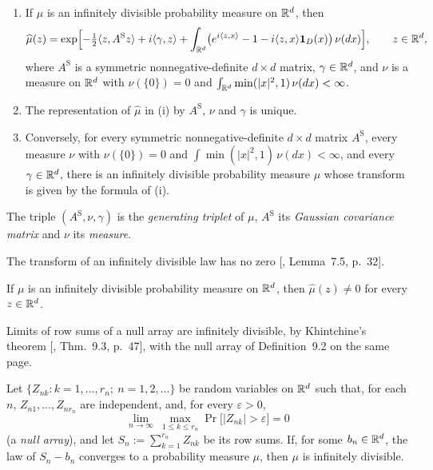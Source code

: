 \begin{theorem}
\label{thm:cited-A39}

\begin{enumerate}
\item[(i)] If $\mu$ is an infinitely divisible probability measure on $\mathbb{R}^d$, then
\[
  \widehat\mu(z) = \exp\Bigl[-\tfrac12\langle z, A^{\mathrm S}z\rangle + i\langle\gamma, z\rangle
  + \int_{\mathbb{R}^d}\bigl(e^{i\langle z, x\rangle} - 1 - i\langle z, x\rangle\mathbf{1}_D(x)\bigr)\,
  \nu(dx)\Bigr], \qquad z \in \mathbb{R}^d,
\]
where $A^{\mathrm S}$ is a symmetric nonnegative-definite $d \times d$ matrix, $\gamma \in \mathbb{R}^d$, and $\nu$
is a measure on $\mathbb{R}^d$ with $\nu(\{0\}) = 0$ and $\int_{\mathbb{R}^d}\min(|x|^2, 1)\,\nu(dx) < \infty$.
\item[(ii)] The representation of $\widehat\mu$ in (i) by $A^{\mathrm S}$, $\nu$ and $\gamma$ is unique.
\item[(iii)] Conversely, for every symmetric nonnegative-definite $d \times d$ matrix $A^{\mathrm S}$, every
measure $\nu$ with $\nu(\{0\}) = 0$ and $\int\min(|x|^2, 1)\,\nu(dx) < \infty$, and every
$\gamma \in \mathbb{R}^d$, there is an infinitely divisible probability measure $\mu$ whose transform is
given by the formula of (i).
\end{enumerate}
The triple $(A^{\mathrm S}, \nu, \gamma)$ is the \emph{generating triplet} of $\mu$, $A^{\mathrm S}$ its
\emph{Gaussian covariance matrix} and $\nu$ its \emph{\Levy{} measure}.
\end{theorem}

The transform of an infinitely divisible law has no zero [, Lemma~7.5,
p.~32].

\begin{theorem}
\label{thm:cited-A40}

If $\mu$ is an infinitely divisible probability measure on $\mathbb{R}^d$, then $\widehat\mu(z) \ne 0$ for
every $z \in \mathbb{R}^d$.
\end{theorem}

Limits of row sums of a null array are infinitely divisible, by Khintchine's theorem
[, Thm.~9.3, p.~47], with the null array of Definition~9.2 on the same page.

\begin{theorem}
\label{thm:cited-A41}

Let $\{Z_{nk} : k = 1, \dots, r_n;\ n = 1, 2, \dots\}$ be random variables on $\mathbb{R}^d$ such that, for
each $n$, $Z_{n1}, \dots, Z_{nr_n}$ are independent, and, for every $\varepsilon > 0$,
\[
  \lim_{n \to \infty}\ \max_{1 \le k \le r_n}\Pr\bigl[|Z_{nk}| > \varepsilon\bigr] = 0
\]
(a \emph{null array}), and let $S_n := \sum_{k=1}^{r_n}Z_{nk}$ be its row sums. If, for some
$b_n \in \mathbb{R}^d$, the law of $S_n - b_n$ converges to a probability measure $\mu$, then $\mu$ is
infinitely divisible.
\end{theorem}

